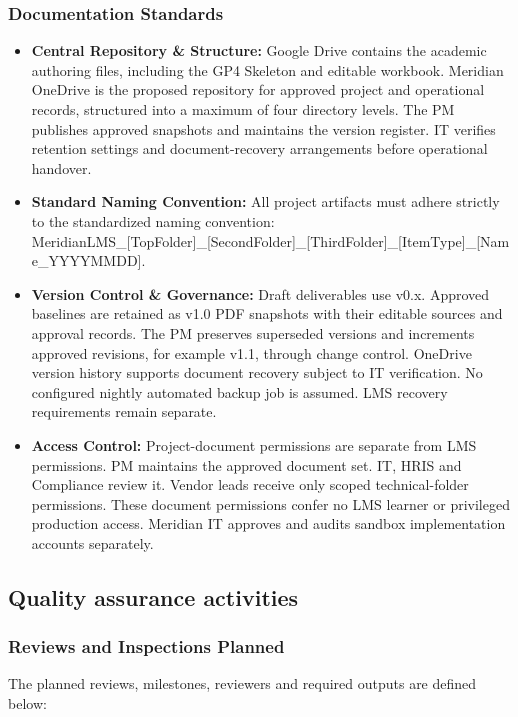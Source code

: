 \subsubsection{Documentation Standards}\label{sec:documentation-standards}
\begin{itemize}
\item \textbf{Central Repository \& Structure:} Google Drive contains the academic authoring files, including the GP4 Skeleton and editable workbook. Meridian OneDrive is the proposed repository for approved project and operational records, structured into a maximum of four directory levels. The PM publishes approved snapshots and maintains the version register. IT verifies retention settings and document-recovery arrangements before operational handover.
\item \textbf{Standard Naming Convention:} All project artifacts must adhere strictly to the standardized naming convention: MeridianLMS\_\allowbreak{}[TopFolder]\_\allowbreak{}[SecondFolder]\_\allowbreak{}[ThirdFolder]\_\allowbreak{}[ItemType]\_\allowbreak{}[Name\_\allowbreak{}YYYYMMDD].
\item \textbf{Version Control \& Governance:} Draft deliverables use v0.x. Approved baselines are retained as v1.0 PDF snapshots with their editable sources and approval records. The PM preserves superseded versions and increments approved revisions, for example v1.1, through change control. OneDrive version history supports document recovery subject to IT verification. No configured nightly automated backup job is assumed. LMS recovery requirements remain separate.
\item \textbf{Access Control:} Project-document permissions are separate from LMS permissions. PM maintains the approved document set. IT, HRIS and Compliance review it. Vendor leads receive only scoped technical-folder permissions. These document permissions confer no LMS learner or privileged production access. Meridian IT approves and audits sandbox implementation accounts separately.
\end{itemize}


\clearpage
\subsection{Quality assurance activities}\label{sec:6.2}
\subsubsection{Reviews and Inspections Planned}\label{sec:reviews-and-inspections-planned}
The planned reviews, milestones, reviewers and required outputs are defined below:


